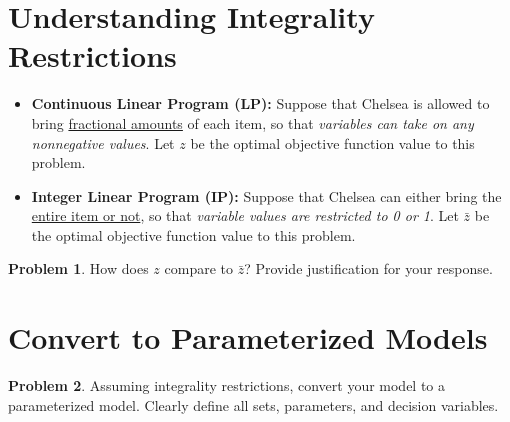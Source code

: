 \documentclass[12pt]{article}
\theoremstyle{definition}
\newtheorem{problem}{Problem}
\begin{document}
\vfill
\newpage

\section{Understanding Integrality Restrictions}
\begin{itemize}
\item \textbf{Continuous Linear Program (LP):}  Suppose that Chelsea is allowed to bring \underline{fractional amounts} of each item, so that \emph{variables can take on any nonnegative values}. Let $z$ be the optimal objective function value to this problem.

\item \textbf{Integer Linear Program (IP):} Suppose that Chelsea can either bring the \underline{entire item or not}, so that \emph{variable values are restricted to  0 or 1}. Let $\bar{z}$ be the optimal objective function value to this problem.
\end{itemize}
\begin{problem} How does $z$ compare to $\bar{z}$? Provide justification for your response. \end{problem}

\vfill

\pagebreak
\section{Convert to Parameterized Models}
\begin{problem}
Assuming integrality restrictions, convert your model to a parameterized model.  Clearly define all sets, parameters, and decision variables. \\
\end{problem}







\vskip 15cm
\end{document}
